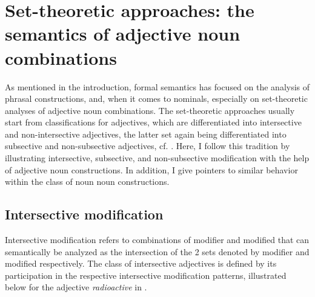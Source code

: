 
\section[Set-theoretic approaches]{Set-theoretic approaches: the
  semantics of adjective noun combinations}

As mentioned in the introduction, formal semantics has focused on the
analysis of phrasal constructions, and, when it comes to nominals,
especially on set-theoretic analyses of adjective noun combinations.
The set-theoretic approaches  usually start from classifications for
adjectives, which are differentiated into intersective and
non-intersective adjectives, the latter set again being 
differentiated into subsective and non-subsective adjectives, cf. \citet{Partee:1995}.
Here, I follow this tradition by illustrating intersective,
subsective, and non-subsective modification with the help of
adjective noun constructions. %
In addition, I give pointers to similar behavior within the class of
noun noun constructions.

\subsection{Intersective modification}
\label{sec:intersectives}
Intersective modification refers to combinations of modifier and
modified that can semantically be analyzed as the intersection of the
2 sets denoted by modifier and modified respectively. The class of
intersective adjectives is defined by its participation in the
respective intersective modification patterns, illustrated below for the
adjective \emph{radioactive} in \Next.


